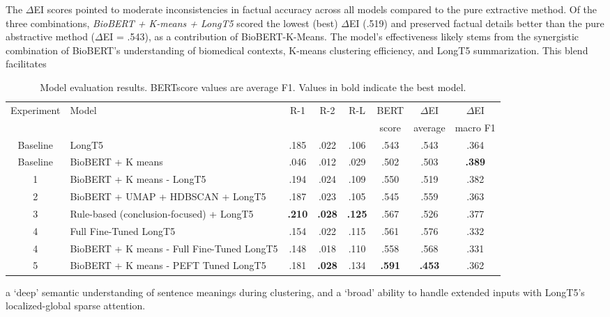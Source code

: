 \documentclass[11pt]{article}
\newcommand{\justifylastline}{\setlength{\parfillskip}{0pt}}
\begin{document}
\justifylastline
The $\Delta$EI scores pointed to moderate inconsistencies in factual accuracy across all models compared to the pure extractive method. Of the three combinations, \textit{BioBERT + K-means + LongT5} scored the lowest (best) $\Delta$EI (.519) and preserved factual details better than the pure abstractive method ($\Delta$EI = .543), as a contribution of BioBERT-K-Means. The model's effectiveness likely stems from the synergistic combination of BioBERT's understanding of biomedical contexts, K-means clustering efficiency, and LongT5 summarization. This blend facilitates
\FloatBarrier
\begin{table*}[h!]
  \centering
  \small
  \begin{tabular}{clcccccc}
    \toprule
    Experiment & Model & R-1  & R-2 & R-L & BERT & $\Delta$EI & $\Delta$EI \\
    & & & & & score & average & macro F1 \\
    \midrule
    Baseline & LongT5 & .185 & .022 & .106 & .543 & .543& .364 \\
    Baseline & BioBERT + K means & .046 & .012 & .029 & .502 & .503 & \textbf{.389}\\
    1 & BioBERT + K means - LongT5 & .194 & .024 & .109 & .550 & .519 & .382 \\
    2 & BioBERT + UMAP + HDBSCAN + LongT5 & .187 & .023 & .105 & .545& .559 & .363 \\
    3 & Rule-based (conclusion-focused) + LongT5 & \textbf{.210} & \textbf{.028} & \textbf{.125} & .567 & .526 & .377\\
    4 & Full Fine-Tuned LongT5 & .154 & .022 & .115 & .561 & .576 & .332 \\
    4 & BioBERT + K means - Full Fine-Tuned LongT5 & .148 & .018 & .110 & .558 & .568 & .331 \\
    5 & BioBERT + K means - PEFT Tuned LongT5 & .181 & \textbf{.028}& .134 & \textbf{.591} & \textbf{.453}& .362 \\
    \bottomrule
  \end{tabular}
  \caption{Model evaluation results. BERTscore values are average F1. Values in bold indicate the best model.}
  \label{tab:model_evaluation_all}
\end{table*}
\FloatBarrier
\setlength{\parfillskip}{0pt plus 1fil}

\noindent a ‘deep’ semantic understanding of sentence meanings during clustering, and a ‘broad’ ability to handle extended inputs with LongT5’s localized-global sparse attention.
\end{document}
